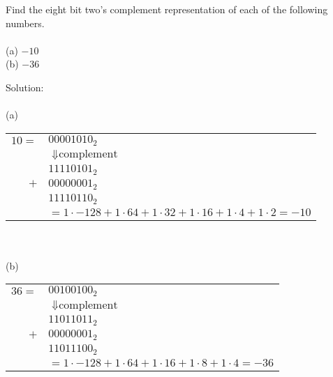 Find the eight bit two's complement representation of each of the following numbers. \\
\\
(a) $-10$\\
(b) $-36$

Solution: \\
\\
(a)\\
\begin{tabular}{rl}
  $10 =$ & $00001010_2$\\
         & $\Downarrow \textrm{complement}$\\
         & $11110101_2$\\
     $+$ & $00000001_2$\\
         & $11110110_2$\\
         & $= 1 \cdot -128 + 1 \cdot 64 + 1 \cdot 32 + 1 \cdot 16 + 1 \cdot 4 + 1 \cdot 2= -10$
\end{tabular}\\
\\
(b)\\
\begin{tabular}{rl}
  $36 =$ & $00100100_2$\\
         & $\Downarrow \textrm{complement}$\\
         & $11011011_2$\\
     $+$ & $00000001_2$\\
         & $11011100_2$\\
         & $= 1 \cdot -128 + 1 \cdot 64 + 1 \cdot 16 + 1 \cdot 8 + 1 \cdot 4 = -36$
\end{tabular}\\

